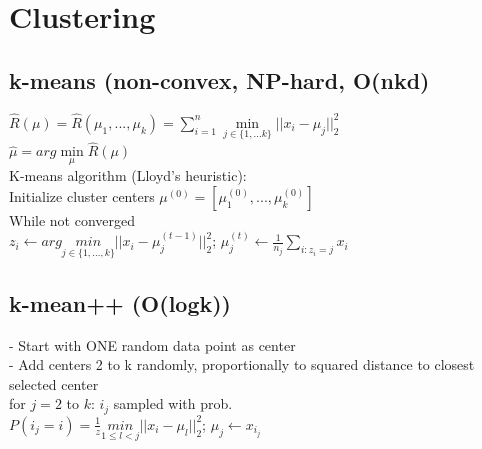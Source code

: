\section*{Clustering}
\subsection*{k-means (non-convex, NP-hard, O(nkd)}
$\hat{R}(\mu) = \hat{R}(\mu_1,...,\mu_k) = \sum_{i=1}^n \underset{j\in\{1,...k\}}{\operatorname{min}}||x_i-\mu_j||_2^2$\\
$\hat{\mu} = arg \underset{\mu}{\operatorname{min}}\hat{R}(\mu)$\\
K-means algorithm (Lloyd's heuristic):\\
Initialize cluster centers $\mu^{(0)} = [\mu_1^{(0)},...,\mu_k^{(0)}]$\\
While not converged\\
$z_i \leftarrow arg \underset{j\in\{1,...,k\}}{min}||x_i - \mu_j^{(t-1)}||_2^2$; $\mu_j^{(t)} \leftarrow \frac{1}{n_j}\sum_{i:z_i=j}x_i$

\subsection*{k-mean++ (O(logk))}
- Start with ONE random data point as center\\
- Add centers 2 to k randomly, proportionally to squared distance to closest selected center\\
for $j=2$ to $k$:
$i_j$ sampled with prob.\\
$P(i_j=i) = \frac{1}{z} \underset{1\leq l<j}{min}||x_i-\mu_l||_2^2$; $\mu_j \leftarrow x_{i_j}$